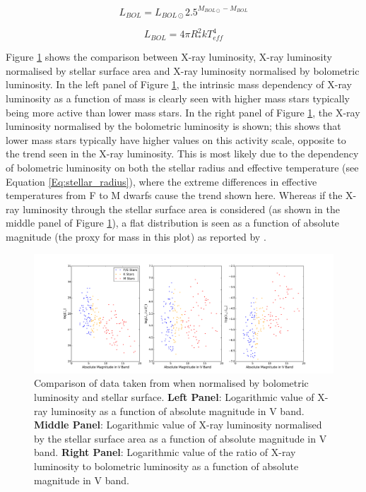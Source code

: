 \begin{equation}
    L_{BOL} = L_{BOL\odot} 2.5^{M_{BOL\odot} - M_{BOL}}
    \label{Eq:bolometric_luminosity}
\end{equation}

\begin{equation}
    L_{BOL} = 4\pi R_{*}^{2}kT_{eff}^{4}
    \label{Eq:stellar_radius}
\end{equation}

Figure \ref{fig:Lx_normalise_schmitt_data} shows the comparison between X-ray luminosity, X-ray luminosity normalised by stellar surface area and X-ray luminosity normalised by bolometric luminosity. In the left panel of Figure \ref{fig:Lx_normalise_schmitt_data}, the intrinsic mass dependency of X-ray luminosity as a function of mass is clearly seen with higher mass stars typically being more active than lower mass stars. In the right panel of Figure \ref{fig:Lx_normalise_schmitt_data}, the X-ray luminosity normalised by the bolometric luminosity is shown; this shows that lower mass stars typically have higher values on this activity scale, opposite to the trend seen in the X-ray luminosity. This is most likely due to the dependency of bolometric luminosity on both the stellar radius and effective temperature (see Equation \ref{Eq:stellar_radius}), where the extreme differences in effective temperatures from F to M dwarfs cause the trend shown here. Whereas if the X-ray luminosity through the stellar surface area is considered (as shown in the middle panel of Figure \ref{fig:Lx_normalise_schmitt_data}), a flat distribution is seen as a function of absolute magnitude (the proxy for mass in this plot) as reported by \citet{Schmitt_Liefke_2004}.

\begin{figure}
    \centering
    \includegraphics[scale=0.33]{Figures/3-Xray_age/normalise_schmitt_data.pdf}
    \caption[Comparison of X-ray luminosity and normalised parameters]{Comparison of data taken from \citet{Schmitt_Liefke_2004} when normalised by bolometric luminosity and stellar surface. \textbf{Left Panel}: Logarithmic value of X-ray luminosity as a function of absolute magnitude in V band. \textbf{Middle Panel}: Logarithmic value of X-ray luminosity normalised by the stellar surface area as a function of absolute magnitude in V band. \textbf{Right Panel}: Logarithmic value of the ratio of X-ray luminosity to bolometric luminosity as a function of absolute magnitude in V band.}
    \label{fig:Lx_normalise_schmitt_data}
\end{figure}

